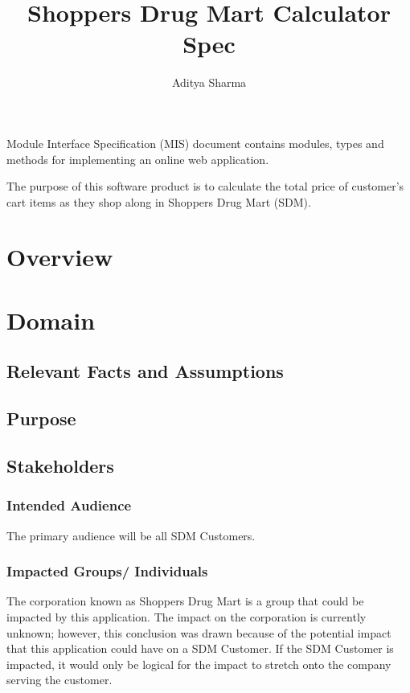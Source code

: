 \documentclass[12pt]{article}
\title{Shoppers Drug Mart Calculator Spec}
\author{Aditya Sharma}
\begin{document}
\maketitle
Module Interface Specification (MIS) document contains modules, types and
methods for implementing an online web application.

The purpose of this software product is to calculate the total price of customer's
cart items as they shop along in Shoppers Drug Mart (SDM).




\newpage
\section{Overview}


\newpage
\section{Domain}

\subsection{Relevant Facts and Assumptions}

\subsection{Purpose}
\subsection{Stakeholders}
\subsubsection{Intended Audience}
The primary audience will be all SDM Customers.

\subsubsection{Impacted Groups/ Individuals}
The corporation known as Shoppers Drug Mart is a group that could be impacted by this application.
The impact on the corporation is currently unknown; however, this conclusion was drawn because of the
potential impact that this application could have on a SDM Customer. If the SDM Customer is impacted,
it would only be logical for the impact to stretch onto the company serving the customer.
\end{document}

